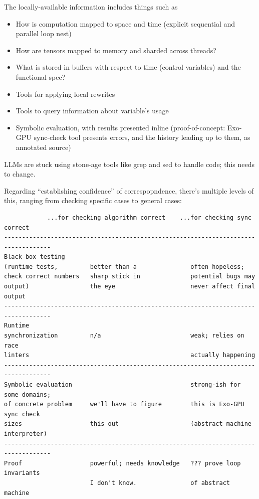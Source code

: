 The locally-available information includes things such as
\begin{itemize}
  \item How is computation mapped to space and time (explicit sequential and parallel loop nest)
  \item How are tensors mapped to memory and sharded across threads?
  \item What is stored in buffers with respect to time (control variables) and the functional spec?
  \item Tools for applying local rewrites
  \item Tools to query information about variable's usage
  \item Symbolic evaluation, with results presented inline (proof-of-concept: Exo-GPU sync-check tool presents errors, and the history leading up to them, as annotated source)
\end{itemize}
LLMs are stuck using stone-age tools like grep and sed to handle code; this needs to change.

Regarding ``establishing confidence'' of correspopndence, there's multiple levels of this, ranging from checking specific cases to general cases:

\clearpage

\begin{verbatim}
            ...for checking algorithm correct    ...for checking sync correct
-----------------------------------------------------------------------------------
Black-box testing
(runtime tests,         better than a               often hopeless;
check correct numbers   sharp stick in              potential bugs may
output)                 the eye                     never affect final output
-----------------------------------------------------------------------------------
Runtime
synchronization         n/a                         weak; relies on race
linters                                             actually happening
-----------------------------------------------------------------------------------
Symbolic evaluation                                 strong-ish for some domains;
of concrete problem     we'll have to figure        this is Exo-GPU sync check
sizes                   this out                    (abstract machine interpreter)
-----------------------------------------------------------------------------------
Proof                   powerful; needs knowledge   ??? prove loop invariants
                        I don't know.               of abstract machine
\end{verbatim}

